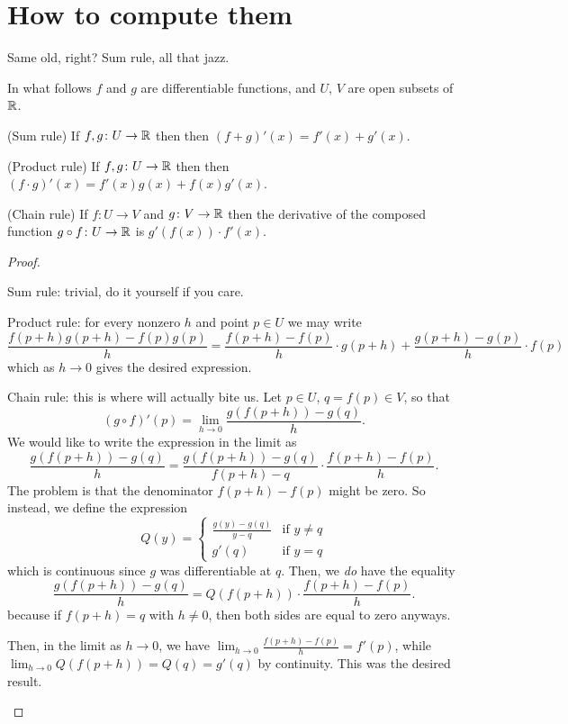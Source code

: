 \section{How to compute them}
Same old, right?
Sum rule, all that jazz.

\begin{theorem}
	In what follows $f$ and $g$ are differentiable functions,
	and $U$, $V$ are open subsets of $\mathbb R$.
	\begin{itemize}
		\ii (Sum rule) If $f,g \colon U \to \mathbb R$ then
		then $(f+g)'(x) = f'(x) + g'(x)$.

		\ii (Product rule) If $f,g \colon U \to \mathbb R$ then
		then $(f \cdot g)'(x) = f'(x) g(x) + f(x) g'(x)$.

		\ii (Chain rule) If $f \colon U \to V$ and $g \colon V \to \mathbb R$
		then the derivative of the composed function
		$g \circ f \colon U \to \mathbb R$ is $g'(f(x)) \cdot f'(x)$.
	\end{itemize}
\end{theorem}
\begin{proof}
	\begin{itemize}
	\ii Sum rule: trivial, do it yourself if you care.

	\ii Product rule: for every nonzero $h$ and point $p \in U$
	we may write
	\[
		\frac{f(p+h) g(p+h) - f(p) g(p)}{h}
		= \frac{f(p+h) - f(p)}{h} \cdot g(p+h)
		+ \frac{g(p+h)-g(p)}{h} \cdot f(p)
	\]
	which as $h \to 0$ gives the desired expression.

	\ii Chain rule: this is where \Cref{abuse:limit}
	will actually bite us.
	Let $p \in U$, $q = f(p) \in V$, so that
	\[ (g \circ f)'(p) = \lim_{h \to 0} \frac{g(f(p+h)) - g(q)}{h}. \]
	We would like to write the expression in the limit as
	\[ \frac{g(f(p+h)) - g(q)}{h}
		= \frac{g(f(p+h)) - g(q)}{f(p+h) - q}
		\cdot \frac{f(p+h) - f(p)}{h}. \]
	The problem is that the denominator $f(p+h)-f(p)$ might be zero.
	So instead, we define the expression
	\[
		Q(y) = \begin{cases}
			\frac{g(y) - g(q)}{y - q} & \text{if } y \ne q \\
			g'(q) & \text{if } y = q
		\end{cases}
	\]
	which is continuous since $g$ was differentiable at $q$.
	Then, we \emph{do} have the equality
	\[ \frac{g(f(p+h)) - g(q)}{h}
		= Q\left( f(p+h) \right) \cdot \frac{f(p+h) - f(p)}{h}. \]
	because if $f(p+h) = q$ with $h \ne 0$,
	then both sides are equal to zero anyways.

	Then, in the limit as $h \to 0$,
	we have $\lim_{h \to 0} \frac{f(p+h)-f(p)}{h} = f'(p)$,
	while $\lim_{h \to 0} Q(f(p+h)) = Q(q) = g'(q)$ by continuity.
	This was the desired result. \qedhere
	\end{itemize}
\end{proof}

